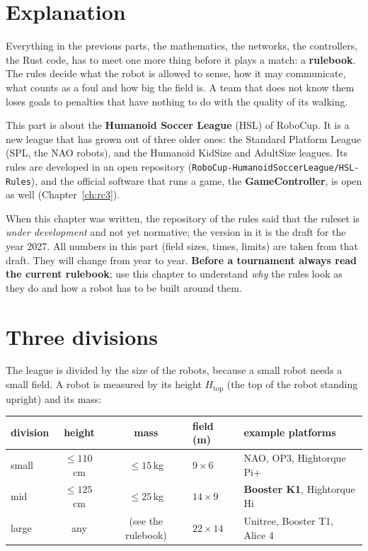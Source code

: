 \label{ch:rc1}

\section*{Explanation}
Everything in the previous parts, the mathematics, the networks, the controllers, the Rust code, has to meet one more thing before it plays a match: a \textbf{rulebook}. The rules decide what the robot is allowed to sense, how it may communicate, what counts as a foul and how big the field is. A team that does not know them loses goals to penalties that have nothing to do with the quality of its walking.

This part is about the \textbf{Humanoid Soccer League} (HSL) of RoboCup. It is a new league that has grown out of three older ones: the Standard Platform League (SPL, the NAO robots), and the Humanoid KidSize and AdultSize leagues. Its rules are developed in an open repository (\texttt{RoboCup-HumanoidSoccerLeague/HSL-Rules}), and the official software that runs a game, the \textbf{GameController}, is open as well (Chapter~\ref{ch:rc3}).

\begin{keyidea}
When this chapter was written, the repository of the rules said that the ruleset is \emph{under development} and not yet normative; the version in it is the draft for the year 2027. All numbers in this part (field sizes, times, limits) are taken from that draft. They will change from year to year. \textbf{Before a tournament always read the current rulebook}; use this chapter to understand \emph{why} the rules look as they do and how a robot has to be built around them.
\end{keyidea}

\section*{Three divisions}
The league is divided by the size of the robots, because a small robot needs a small field. A robot is measured by its height $H_{\mathrm{top}}$ (the top of the robot standing upright) and its mass:

\begin{center}
\small
\begin{tabular}{lccll}
\hline
division & height & mass & field (m) & example platforms\\
\hline
small & $\le110$\,cm & $\le15$\,kg & $9\times6$ & NAO, OP3, Hightorque Pi+\\
mid & $\le125$\,cm & $\le25$\,kg & $14\times9$ & \textbf{Booster K1}, Hightorque Hi\\
large & any & (see the rulebook) & $22\times14$ & Unitree, Booster T1, Alice 4\\
\hline
\end{tabular}
\end{center}

